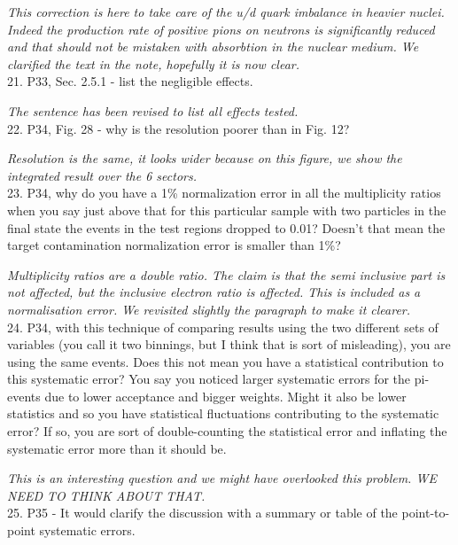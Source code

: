 \documentclass[12pt]{article}
\begin{document}
{\it This correction is here to take care of the u/d quark imbalance in heavier nuclei.
Indeed the production rate of positive pions on neutrons is significantly reduced and that
should not be mistaken with absorbtion in the nuclear medium. We clarified the text in the
note, hopefully it is now clear.} \\


21.
P33, Sec. 2.5.1 - list the negligible effects.

{\it The sentence has been revised to list all effects tested. } \\

22.
P34, Fig. 28 - why is the resolution poorer than in Fig. 12?

{\it Resolution is the same, it looks wider because on this figure, we show the integrated 
result over the 6 sectors.} \\


23.
P34, why do you have a 1\% normalization error in all the multiplicity ratios when you say just 
above that for this particular sample with two particles in the final state the events in the test 
regions dropped to 0.01?  Doesn’t that mean the target contamination normalization error is 
smaller than 1\%?

{\it Multiplicity ratios are a double ratio. The claim is that the semi inclusive part 
is not affected, but the inclusive electron ratio is affected. This is included
as a normalisation error. We revisited slightly the paragraph to make it clearer.} \\


24.
P34, with this technique of comparing results using the two different sets of variables (you 
call it two binnings, but I think that is sort of misleading), you are using the same events.  
Does this not mean you have a statistical contribution to this systematic error?  You say you 
noticed larger systematic errors for the pi- events due to lower acceptance and bigger 
weights.  Might it also be lower statistics and so you have statistical fluctuations contributing 
to the systematic error?  If so, you are sort of double-counting the statistical error and 
inflating the systematic error more than it should be.  

{\it This is an interesting question and we might have overlooked this problem. WE
NEED TO THINK ABOUT THAT. } \\

25.
P35 - It would clarify the discussion with a summary or table of the point-to-point systematic 
errors.
\end{document}
